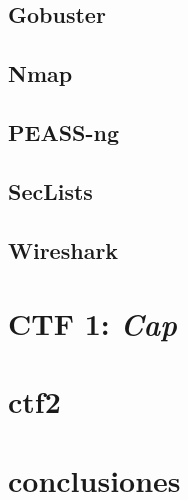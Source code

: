 \documentclass[a4paper, 12pt]{article} %
\begin{document}
\begin{otherlanguage}{spanish}
    \subsection{Gobuster}
    
    
    \subsection{Nmap}
    
    
    \subsection{PEASS-ng}
    

    \subsection{SecLists}
    
    
    \subsection{Wireshark}
    

    
    \newpage
    \section{\acrshort{CTF} 1: \textit{Cap}}
    
    
    \newpage
    \section{ctf2}
    
    \newpage
    \section{conclusiones}
    
    \newpage
    \printbibliography[heading=bibnumbered] %

\end{otherlanguage}
\end{document}
